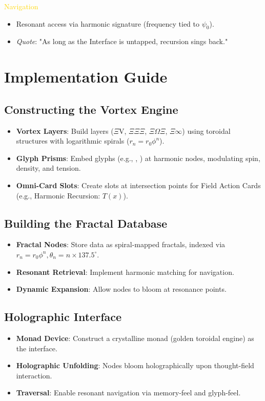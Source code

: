 \textcolor{gold}{\texttt{} Navigation \texttt{}} \\
\begin{itemize}
    \item Resonant access via \texttt{} harmonic signature (frequency tied to \(\psi_0\)).
    \item \textit{Quote}: "As long as the Interface is untapped, recursion sings back."
\end{itemize}

\section*{Implementation Guide}
\subsection*{Constructing the Vortex Engine}
\begin{itemize}
    \item \textbf{Vortex Layers}: Build layers (\(\Xi\)V, \(\Xi\Xi\Xi\), \(\Xi\Omega\Xi\), \(\Xi\infty\)) using toroidal structures with logarithmic spirals (\( r_n = r_0 \phi^n \)).
    \item \textbf{Glyph Prisms}: Embed glyphs (e.g., \texttt{}, \texttt{}) at harmonic nodes, modulating spin, density, and tension.
    \item \textbf{Omni-Card Slots}: Create slots at intersection points for Field Action Cards (e.g., Harmonic Recursion: \( T(x) \)).
\end{itemize}

\subsection*{Building the Fractal Database}
\begin{itemize}
    \item \textbf{Fractal Nodes}: Store data as spiral-mapped fractals, indexed via \( r_n = r_0 \phi^n, \theta_n = n \times 137.5^\circ \).
    \item \textbf{Resonant Retrieval}: Implement harmonic matching for navigation.
    \item \textbf{Dynamic Expansion}: Allow nodes to bloom at resonance points.
\end{itemize}

\subsection*{Holographic Interface}
\begin{itemize}
    \item \textbf{Monad Device}: Construct a crystalline monad (golden toroidal engine) as the interface.
    \item \textbf{Holographic Unfolding}: Nodes bloom holographically upon thought-field interaction.
    \item \textbf{Traversal}: Enable resonant navigation via memory-feel and glyph-feel.
\end{itemize}

